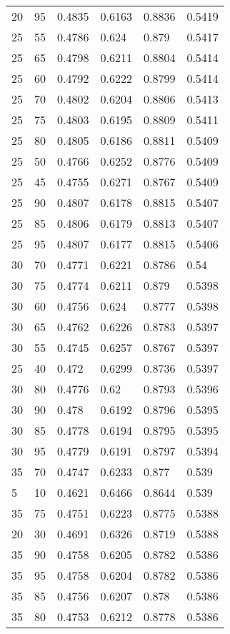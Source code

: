 \begin{center}
\begin{longtable}{|l|l|l|l|l|l|}
20 & 95 & 0.4835 & 0.6163 & 0.8836 & 0.5419 \\
25 & 55 & 0.4786 & 0.624  & 0.879  & 0.5417 \\
25 & 65 & 0.4798 & 0.6211 & 0.8804 & 0.5414 \\
25 & 60 & 0.4792 & 0.6222 & 0.8799 & 0.5414 \\
25 & 70 & 0.4802 & 0.6204 & 0.8806 & 0.5413 \\
25 & 75 & 0.4803 & 0.6195 & 0.8809 & 0.5411 \\
25 & 80 & 0.4805 & 0.6186 & 0.8811 & 0.5409 \\
25 & 50 & 0.4766 & 0.6252 & 0.8776 & 0.5409 \\
25 & 45 & 0.4755 & 0.6271 & 0.8767 & 0.5409 \\
25 & 90 & 0.4807 & 0.6178 & 0.8815 & 0.5407 \\
25 & 85 & 0.4806 & 0.6179 & 0.8813 & 0.5407 \\
25 & 95 & 0.4807 & 0.6177 & 0.8815 & 0.5406 \\
30 & 70 & 0.4771 & 0.6221 & 0.8786 & 0.54   \\
30 & 75 & 0.4774 & 0.6211 & 0.879  & 0.5398 \\
30 & 60 & 0.4756 & 0.624  & 0.8777 & 0.5398 \\
30 & 65 & 0.4762 & 0.6226 & 0.8783 & 0.5397 \\
30 & 55 & 0.4745 & 0.6257 & 0.8767 & 0.5397 \\
25 & 40 & 0.472  & 0.6299 & 0.8736 & 0.5397 \\
30 & 80 & 0.4776 & 0.62   & 0.8793 & 0.5396 \\
30 & 90 & 0.478  & 0.6192 & 0.8796 & 0.5395 \\
30 & 85 & 0.4778 & 0.6194 & 0.8795 & 0.5395 \\
30 & 95 & 0.4779 & 0.6191 & 0.8797 & 0.5394 \\
35 & 70 & 0.4747 & 0.6233 & 0.877  & 0.539  \\
5  & 10 & 0.4621 & 0.6466 & 0.8644 & 0.539  \\
35 & 75 & 0.4751 & 0.6223 & 0.8775 & 0.5388 \\
20 & 30 & 0.4691 & 0.6326 & 0.8719 & 0.5388 \\
35 & 90 & 0.4758 & 0.6205 & 0.8782 & 0.5386 \\
35 & 95 & 0.4758 & 0.6204 & 0.8782 & 0.5386 \\
35 & 85 & 0.4756 & 0.6207 & 0.878  & 0.5386 \\
35 & 80 & 0.4753 & 0.6212 & 0.8778 & 0.5386 \\

\end{longtable}
\end{center}
